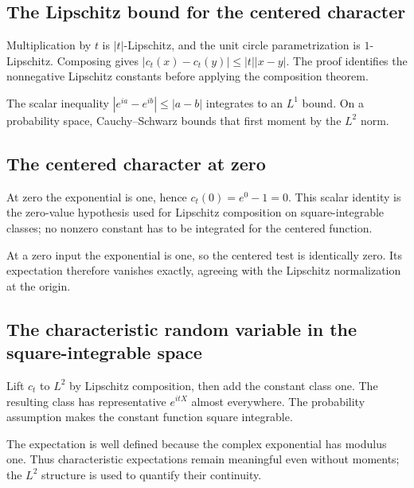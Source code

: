 \documentclass[11pt,a4paper]{report}
\begin{document}
\subsection{\texorpdfstring{The Lipschitz bound for the centered character}{The Lipschitz bound for the centered character}}
\label{report-step-UnadjustedLangevin-LpCharacteristic-lean-2}


Multiplication by \(t\) is \(|t|\)-Lipschitz, and the unit circle parametrization is \(1\)-Lipschitz. Composing gives \(|c_t(x)-c_t(y)|\le|t||x-y|\). The proof identifies the nonnegative Lipschitz constants before applying the composition theorem.



The scalar inequality \(|e^{ia}-e^{ib}|\le|a-b|\) integrates to an \(L^1\) bound. On a probability space, Cauchy–Schwarz bounds that first moment by the \(L^2\) norm.

\subsection{\texorpdfstring{The centered character at zero}{The centered character at zero}}
\label{report-step-UnadjustedLangevin-LpCharacteristic-lean-3}


At zero the exponential is one, hence \(c_t(0)=e^0-1=0\). This scalar identity is the zero-value hypothesis used for Lipschitz composition on square-integrable classes; no nonzero constant has to be integrated for the centered function.



At a zero input the exponential is one, so the centered test is identically zero. Its expectation therefore vanishes exactly, agreeing with the Lipschitz normalization at the origin.

\subsection{\texorpdfstring{The characteristic random variable in the square-integrable space}{The characteristic random variable in the square-integrable space}}
\label{report-step-UnadjustedLangevin-LpCharacteristic-lean-4}


Lift \(c_t\) to \(L^2\) by Lipschitz composition, then add the constant class one. The resulting class has representative \(e^{itX}\) almost everywhere. The probability assumption makes the constant function square integrable.



The expectation is well defined because the complex exponential has modulus one. Thus characteristic expectations remain meaningful even without moments; the \(L^2\) structure is used to quantify their continuity.
\end{document}
